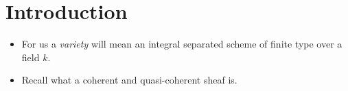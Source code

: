 \section*{Introduction}


\vspace{3cm}

\begin{itemize}
    \item{For us a \emph{variety} will mean an integral separated scheme of finite type over a field $k$. }
    \item{Recall what a coherent and quasi-coherent sheaf is. } 
\end{itemize}


